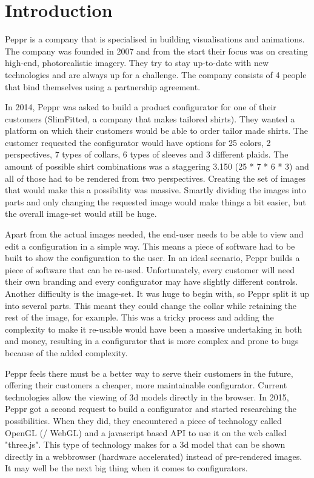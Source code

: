 \chapter{Introduction}

Peppr is a company that is specialised in building visualisations and animations. The company was founded in 2007 and from the start their focus was on creating high-end, photorealistic imagery. They try to stay up-to-date with new technologies and are always up for a challenge. The company consists of 4 people that bind themselves using a partnership agreement.

In 2014, Peppr was asked to build a product configurator for one of their customers (SlimFitted, a company that makes tailored shirts). They wanted a platform on which their customers would be able to order tailor made shirts. The customer requested the configurator would have options for 25 colors, 2 perspectives, 7 types of collars, 6 types of sleeves and 3 different plaids. The amount of possible shirt combinations was a staggering 3.150 (25 * 7 * 6 * 3) and all of those had to be rendered from two perspectives. Creating the set of images that would make this a possibility was massive. Smartly dividing the images into parts and only changing the requested image would make things a bit easier, but the overall image-set would still be huge.

Apart from the actual images needed, the end-user needs to be able to view and edit a configuration in a simple way. This means a piece of software had to be built to show the configuration to the user. In an ideal scenario, Peppr builds a piece of software that can be re-used. Unfortunately, every customer will need their own branding and every configurator may have slightly different controls. Another difficulty is the image-set. It was huge to begin with, so Peppr split it up into several parts. This meant they could change the collar while retaining the rest of the image, for example. This was a tricky process and adding the complexity to make it re-usable would have been a massive undertaking in both and money, resulting in a configurator that is more complex and prone to bugs because of the added complexity.

Peppr feels there must be a better way to serve their customers in the future, offering their customers a cheaper, more maintainable configurator. Current technologies allow the viewing of 3d models directly in the browser. In 2015, Peppr got a second request to build a configurator and started researching the possibilities. When they did, they encountered a piece of technology called OpenGL (/ WebGL) and a javascript based API to use it on the web called "three.js". This type of technology makes for a 3d model that can be shown directly in a webbrowser (hardware accelerated) instead of pre-rendered images. It may well be the next big thing when it comes to configurators.

